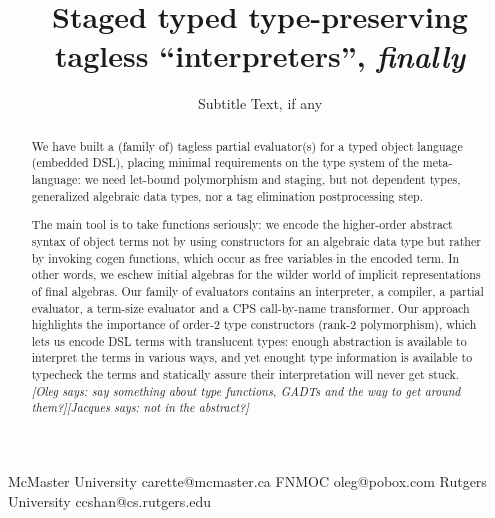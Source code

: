 \documentclass[preprint]{sigplanconf}
\newcommand{\jacques}[1]{{\it [Jacques says: #1]}}
\newcommand{\oleg}[1]{{\it [Oleg says: #1]}}
\begin{document}
\copyrightdata{[to be supplied]} 


\title{Staged typed type-preserving tagless ``interpreters'', \emph{finally}}
\subtitle{Subtitle Text, if any}

           {McMaster University}
           {carette@mcmaster.ca}
           {FNMOC}
           {oleg@pobox.com}
           {Rutgers University}
           {ccshan@cs.rutgers.edu}

\maketitle

\begin{abstract}
We have built a (family of) tagless partial evaluator(s) for a typed object
language (embedded DSL), placing minimal requirements on
the type system of the meta-language:
we need let-bound polymorphism and staging, but not dependent
types, generalized algebraic data types, nor a tag elimination 
postprocessing step.

The main tool is to take functions seriously: we encode the
higher-order abstract syntax of object terms not by using constructors for
an algebraic data type but rather by invoking cogen functions, which occur as
free variables in the encoded term.  In other words, we eschew initial
algebras for the wilder world of implicit representations of final algebras.
Our family of evaluators contains an interpreter, a compiler, a partial
evaluator, a term-size evaluator and a CPS call-by-name transformer.
Our approach highlights the importance of order-2 type constructors
(rank-2 polymorphism), which lets us encode DSL terms with
translucent types: enough abstraction is available to interpret the
terms in various ways, and yet enought type information is available 
to typecheck the terms and statically assure their interpretation will
never get stuck.
\oleg{say something about type functions, GADTs and the way to get
  around them?}\jacques{not in the abstract?}
\end{abstract}

\end{document}
